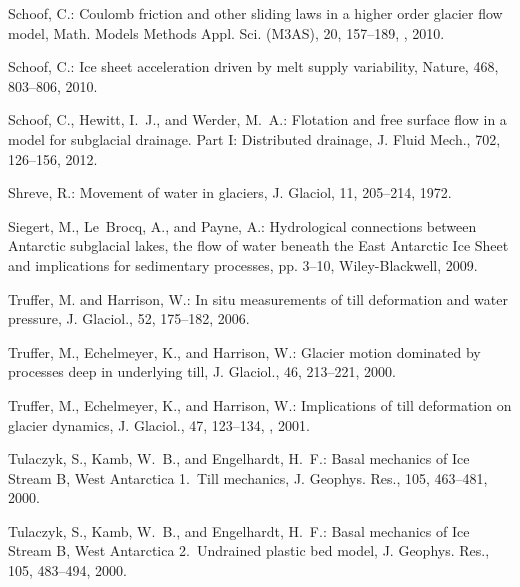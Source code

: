 \documentclass[gmd]{copernicus}   %
\begin{document}
\begin{thebibliography}{}
Schoof, C.: Coulomb friction and other sliding laws in a higher order glacier
  flow model, Math. Models Methods Appl. Sci. (M3AS), 20, 157--189,
  , 2010{}.

Schoof, C.: Ice sheet acceleration driven by melt supply variability, Nature,
  468, 803--806, 2010{}.

Schoof, C., Hewitt, I.~J., and Werder, M.~A.: Flotation and free surface flow
  in a model for subglacial drainage. {P}art {I}: {D}istributed drainage, J.
  Fluid Mech., 702, 126--156, 2012.

Shreve, R.: Movement of water in glaciers, J. Glaciol, 11, 205--214, 1972.

Siegert, M., Le~Brocq, A., and Payne, A.: Hydrological connections between
  Antarctic subglacial lakes, the flow of water beneath the East Antarctic Ice
  Sheet and implications for sedimentary processes, pp. 3--10, Wiley-Blackwell,
  2009.

Truffer, M. and Harrison, W.: In situ measurements of till deformation and
  water pressure, J. Glaciol., 52, 175--182, 2006.

Truffer, M., Echelmeyer, K., and Harrison, W.: Glacier motion dominated by
  processes deep in underlying till, J. Glaciol., 46, 213--221, 2000.

Truffer, M., Echelmeyer, K., and Harrison, W.: Implications of till deformation
  on glacier dynamics, J. Glaciol., 47, 123--134,
  , 2001.

Tulaczyk, S., Kamb, W.~B., and Engelhardt, H.~F.: Basal mechanics of {I}ce
  {S}tream {B}, {W}est {A}ntarctica 1.~{T}ill mechanics, J. Geophys. Res., 105,
  463--481, 2000{}.

Tulaczyk, S., Kamb, W.~B., and Engelhardt, H.~F.: Basal mechanics of {I}ce
  {S}tream {B}, {W}est {A}ntarctica 2.~{U}ndrained plastic bed model, J.
  Geophys. Res., 105, 483--494, 2000{}.


\end{thebibliography}
\end{document}
